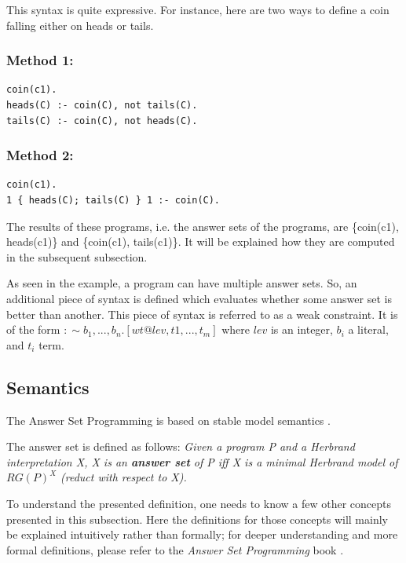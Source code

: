 This syntax is quite expressive. For instance, here are two ways to define a coin falling either on heads or tails.

\subsubsection{Method 1:}
\begin{verbatim}
coin(c1).
heads(C) :- coin(C), not tails(C).
tails(C) :- coin(C), not heads(C).
\end{verbatim}
\subsubsection{Method 2:}
\begin{verbatim}
coin(c1).
1 { heads(C); tails(C) } 1 :- coin(C).
\end{verbatim}

The results of these programs, i.e. the answer sets of the programs, are \{coin(c1), heads(c1)\} and \{coin(c1), tails(c1)\}.
It will be explained how they are computed in the subsequent subsection.

As seen in the example, a program can have multiple answer sets.
So, an additional piece of syntax is defined which evaluates whether some answer set is better than another.
This piece of syntax is referred to as a weak constraint.
It is of the form $:\sim {} b_1,..., b_n.[wt@lev, t1, ..., t_m]$
where $lev$ is an integer, $b_i$ a literal, and $t_i$ term.

\subsection{Semantics}

The Answer Set Programming is based on stable model semantics \cite{RefWorks:RefID:21-fitting1992michael}.

The answer set is defined as follows: 
\emph{Given a program P and a Herbrand interpretation X, X is an \textbf{answer set} of P iff X is a minimal Herbrand model of $RG(P)^X$ (reduct with respect to X).}

To understand the presented definition, one needs to know a few other concepts presented in this subsection.
Here the definitions for those concepts will mainly be explained intuitively rather than formally; for deeper understanding and more formal definitions, please refer to the \emph{Answer Set Programming} book \cite{RefWorks:RefID:23-lifschitz2019answer}. \\

